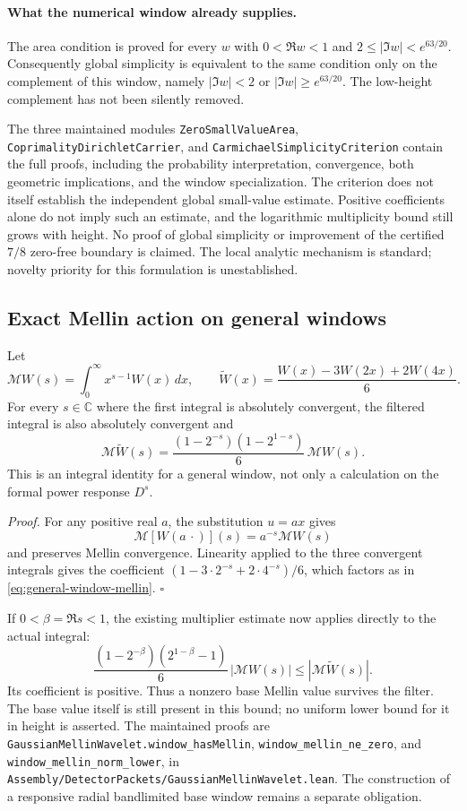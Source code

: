 \paragraph{What the numerical window already supplies.}
The area condition is proved for every \(w\) with
\(0<\Re w<1\) and \(2\le|\Im w|<e^{63/20}\). Consequently global
simplicity is equivalent to the same condition only on the complement
of this window, namely \(|\Im w|<2\) or \(|\Im w|\ge e^{63/20}\).
The low-height complement has not been silently removed.

The three maintained modules
\texttt{ZeroSmallValueArea}, \texttt{CoprimalityDirichletCarrier}, and
\texttt{CarmichaelSimplicityCriterion} contain the full proofs, including
the probability interpretation, convergence, both geometric implications,
and the window specialization. The criterion does not itself establish
the independent global small-value estimate. Positive coefficients alone
do not imply such an estimate, and the logarithmic multiplicity bound
still grows with height. No proof of global simplicity or improvement
of the certified \(7/8\) zero-free boundary is claimed. The local analytic
mechanism is standard; novelty priority for this formulation is unestablished.

\subsection{Exact Mellin action on general windows}
\label{sec:general-window-mellin}

Let
\[
 \mathcal M W(s)=\int_0^\infty x^{s-1}W(x)\,dx,\qquad
 \widetilde W(x)=\frac{W(x)-3W(2x)+2W(4x)}6.
\]
For every \(s\in\mathbb C\) where the first integral is absolutely
convergent, the filtered integral is also absolutely convergent and
\begin{equation}\label{eq:general-window-mellin}
 \mathcal M\widetilde W(s)
 =\frac{(1-2^{-s})(1-2^{1-s})}{6}\,\mathcal M W(s).
\end{equation}
This is an integral identity for a general window, not only a calculation
on the formal power response \(D^s\).

\emph{Proof.}
For any positive real \(a\), the substitution \(u=ax\) gives
\[
 \mathcal M[W(a\,\cdot)](s)=a^{-s}\mathcal M W(s)
\]
and preserves Mellin convergence. Linearity applied to the three
convergent integrals gives the coefficient
\((1-3\cdot2^{-s}+2\cdot4^{-s})/6\), which factors as in
\eqref{eq:general-window-mellin}. \(\square\)

If \(0<\beta=\Re s<1\), the existing multiplier estimate now applies
directly to the actual integral:
\[
 \frac{(1-2^{-\beta})(2^{1-\beta}-1)}6\,|\mathcal M W(s)|
 \le |\mathcal M\widetilde W(s)|.
\]
Its coefficient is positive. Thus a nonzero base Mellin value survives
the filter. The base value itself is still present in this bound;
no uniform lower bound for it in height is asserted.
The maintained proofs are
\texttt{GaussianMellinWavelet.window\_hasMellin},
\texttt{window\_mellin\_ne\_zero}, and
\texttt{window\_mellin\_norm\_lower}, in
\texttt{Assembly/DetectorPackets/GaussianMellinWavelet.lean}.
The construction of a responsive radial bandlimited base window
remains a separate obligation.

